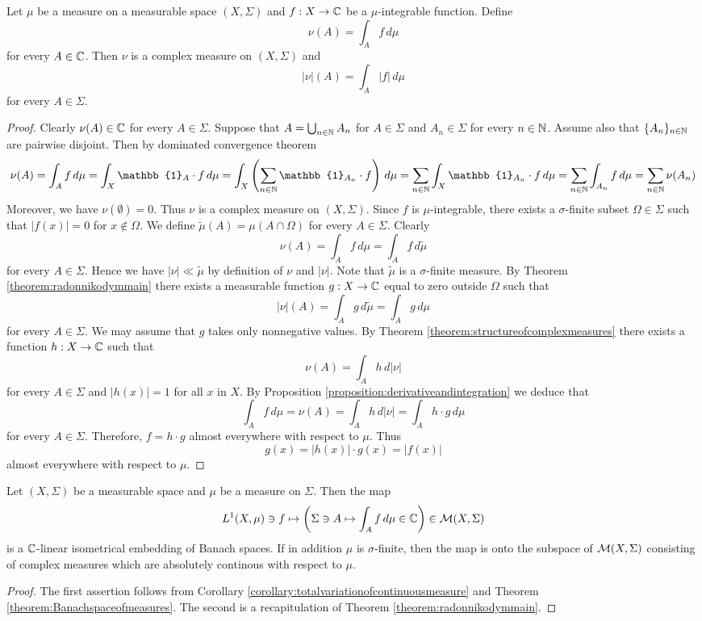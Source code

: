 \begin{corollary}\label{corollary:totalvariationofcontinuousmeasure}
Let $\mu$ be a measure on a measurable space $(X,\Sigma)$ and $f:X\rightarrow {\mathbb C}$ be a $\mu$-integrable function. Define
$$\nu(A) = \int_Af\,d\mu$$
for every $A\in {\mathbb C}$. Then $\nu$ is a complex measure on $(X,\Sigma)$ and
$$|\nu|(A) = \int_A|f|\,d\mu$$
for every $A\in \Sigma$.
\end{corollary}
\begin{proof}
Clearly $\nu(A)\in {\mathbb C}$ for every $A\in \Sigma$. Suppose that $A = \bigcup_{n\in {\mathbb N}}A_n$ for $A\in \Sigma$ and $A_n\in \Sigma$ for every $n\in {\mathbb N}$. Assume also that $\{A_n\}_{n\in {\mathbb N}}$ are pairwise disjoint. Then by dominated convergence theorem
$$\nu(A) = \int_A f\,d\mu = \int_X\mathbb{1}_A\cdot f\,d\mu = \int_X\left(\sum_{n\in \NN}\mathbb{1}_{A_n}\cdot f\right)\,d\mu = \sum_{n\in \NN}\int_X\mathbb{1}_{A_n}\cdot f\,d\mu = \sum_{n\in \NN}\int_{A_n}f\,d\mu = \sum_{n\in \NN}\nu(A_n)$$
Moreover, we have $\nu(\emptyset) = 0$. Thus $\nu$ is a complex measure on $(X,\Sigma)$. Since $f$ is $\mu$-integrable, there exists a $\sigma$-finite subset $\Omega\in \Sigma$ such that $|f(x)|= 0$ for $x\not \in \Omega$. We define $\tilde{\mu}(A) = \mu(A\cap \Omega)$ for every $A\in \Sigma$. Clearly
$$\nu(A) = \int_Af\,d\mu = \int_Af\,d\tilde{\mu}$$
for every $A\in \Sigma$. Hence we have $|\nu|\ll\tilde{\mu}$ by definition of $\nu$ and $|\nu|$. Note that $\tilde{\mu}$ is a $\sigma$-finite measure. By Theorem \ref{theorem:radonnikodymmain} there exists a measurable function $g:X\rightarrow {\mathbb C}$ equal to zero outside $\Omega$ such that
$$|\nu|(A) = \int_Ag\,d\tilde{\mu} = \int_Ag\,d\mu$$
for every $A\in \Sigma$. We may assume that $g$ takes only nonnegative values. By Theorem \ref{theorem:structureofcomplexmeasures} there exists a function $h:X\rightarrow {\mathbb C}$ such that
$$\nu(A) = \int_Ah\,d|\nu|$$
for every $A\in \Sigma$ and $|h(x)|=1$ for all $x$ in $X$. By Proposition \ref{proposition:derivativeandintegration} we deduce that
$$\int_Af\,d\mu = \nu(A) = \int_Ah\,d|\nu| = \int_Ah\cdot g\,d\mu$$
for every $A\in \Sigma$. Therefore, $f = h\cdot g$ almost everywhere with respect to $\mu$. Thus
$$g(x) = |h(x)|\cdot g(x) = |f(x)|$$
almost everywhere with respect to $\mu$.
\end{proof}

\begin{corollary}
Let $(X,\Sigma)$ be a measurable space and $\mu$ be a measure on $\Sigma$. Then the map
$$L^1(X,\mu)\ni f\mapsto \left(\Sigma \ni A \mapsto \int_Af\,d\mu\in {\mathbb C}\right)\in {\mathcal M}(X,\Sigma)$$
is a ${\mathbb C}$-linear isometrical embedding of Banach spaces. If in addition $\mu$ is $\sigma$-finite, then the map is onto the subspace of ${\mathcal M}(X,\Sigma)$ consisting of complex measures which are absolutely continous with respect to $\mu$.
\end{corollary}
\begin{proof}
The first assertion follows from Corollary \ref{corollary:totalvariationofcontinuousmeasure} and Theorem \ref{theorem:Banachspaceofmeasures}. The second is a recapitulation of Theorem \ref{theorem:radonnikodymmain}.
\end{proof}


\small



